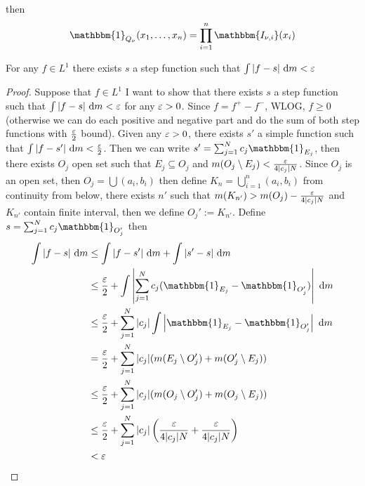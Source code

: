 then \[\mathbbm{1}_{Q_\nu}(x_1, \dotsc, x_n) = \prod_{i=1}^n \mathbbm{I_{\nu, i}}(x_i)\]

\begin{lemma}
  For any $f \in L^1$ there exists $s$ a step function such that $\int |f-s| \ \mathrm{d}m < \eps$
\end{lemma}

\begin{proof}
  Suppose that $f \in L^1$ I want to show that there exists $s$ a step function such that $\int |f-s| \ \mathrm{d}m < \eps$ 
  for any $\varepsilon >0$. Since $f = f^+ - f^-$, WLOG, 
  $f \ge 0$ (otherwise we can do each positive and negative part and do the sum of both step functions with $\frac{\varepsilon}2$ bound). 
  Given any $\varepsilon > 0$, there exists $s'$ a simple function such that $\int |f-s'|\ \mathrm{d}m < \frac\eps2$. Then we can write $s' = \sum_{j=1}^N c_j \mathbbm{1}_{E_j}$, then there exists $O_j$ open set such that $E_j \subseteq O_j$ and $m(O_j\setminus E_j) < \frac{\varepsilon}{4|c_j|N}$. Since $O_j$ is an open set, then $O_j = \bigcup (a_i, b_i)$ then define $K_n = \bigcup_{i=1}^n (a_i, b_i)$ from continuity from below, there exists $n'$ such that $m(K_{n'}) > m(O_j) - \frac{\varepsilon}{4|c_j|N}$ and $K_{n'}$ contain finite interval, then we define $O_j' := K_{n'}$. Define $s = \sum_{j=1}^N c_j\mathbbm{1}_{O_j'}$ then
    \begin{align*}
        \int |f-s|\ \mathrm{d}m &\le \int |f-s'| \ \mathrm{d}m + \int |s'-s| \ \mathrm{d}m \\
        &\le \frac\eps2 + \int \left|\sum_{j=1}^N c_j(\mathbbm{1}_{E_j} - \mathbbm{1}_{O_j'})\right|\ \mathrm{d}m \\
        &\le \frac\eps2 + \sum_{j=1}^N |c_j| \int \left|\mathbbm{1}_{E_j} - \mathbbm{1}_{O_j'}\right|\ \mathrm{d}m \\
        &= \frac\eps2 + \sum_{j=1}^N |c_j| (m(E_j \setminus O_j') + m(O_j' \setminus E_j))\\
        &\le \frac\eps2 + \sum_{j=1}^N |c_j| (m(O_j \setminus O_j') + m(O_j \setminus E_j))\\
        &\le \frac\eps2 + \sum_{j=1}^N |c_j| \left(\frac\eps{4|c_j|N} +\frac\eps{4|c_j|N}\right)\\
        &< \eps
    \end{align*}
\end{proof}
